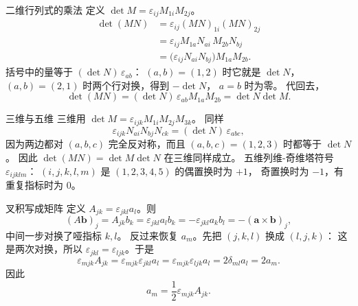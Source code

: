 \documentclass[fontset=windows, chinese, 10pt, xcolor=dvipsnames]{beamer}
\begin{document}
\begin{frame}{二维行列式的乘法}
  定义 $\det M=\varepsilon_{ij}M_{1i}M_{2j}$。
  \begin{align*}
    \det(MN)
    &= \varepsilon_{ij}(MN)_{1i}(MN)_{2j} \\
    &= \varepsilon_{ij}M_{1a}N_{ai}\, M_{2b}N_{bj} \\
    &= \bigl(\varepsilon_{ij}N_{ai}N_{bj}\bigr) M_{1a}M_{2b}.
  \end{align*}
  括号中的量等于 $(\det N)\,\varepsilon_{ab}$：
  $(a,b)=(1,2)$ 时它就是 $\det N$，
  $(a,b)=(2,1)$ 时两个行对换，得到 $-\det N$，
  $a=b$ 时为零。
  代回去，
  \begin{equation*}
    \det(MN)
    =(\det N)\,\varepsilon_{ab}M_{1a}M_{2b}
    =\det N\det M.
  \end{equation*}
\end{frame}

\begin{frame}{三维与五维}
  三维用
  $\det M=\varepsilon_{ijk}M_{1i}M_{2j}M_{3k}$。
  同样
  \begin{equation*}
    \varepsilon_{ijk}N_{ai}N_{bj}N_{ck}
    =(\det N)\,\varepsilon_{abc},
  \end{equation*}
  因为两边都对 $(a,b,c)$ 完全反对称，而且 $(a,b,c)=(1,2,3)$ 时都等于 $\det N$。
  因此 $\det(MN)=\det M\det N$ 在三维同样成立。
  \vspace{0.4em}
  五维列维-奇维塔符号 $\varepsilon_{ijklm}$：
  $(i,j,k,l,m)$ 是 $(1,2,3,4,5)$ 的偶置换时为 $+1$，
  奇置换时为 $-1$，有重复指标时为 $0$。
\end{frame}

\begin{frame}{叉积写成矩阵}
  定义 $A_{jk}=\varepsilon_{jkl}a_l$。则
  \begin{equation*}
    (A\mathbf{b})_j
    =A_{jk}b_k
    =\varepsilon_{jkl}a_l b_k
    =-\varepsilon_{jkl}a_k b_l
    =-(\mathbf{a}\times\mathbf{b})_j,
  \end{equation*}
  中间一步对换了哑指标 $k,l$。
  反过来恢复 $a_m$。先把 $(j,k,l)$ 换成 $(l,j,k)$：
  这是两次对换，所以 $\varepsilon_{jkl}=\varepsilon_{ljk}$。于是
  \begin{equation*}
    \varepsilon_{mjk}A_{jk}
    =\varepsilon_{mjk}\varepsilon_{jkl}a_l
    =\varepsilon_{mjk}\varepsilon_{ljk}a_l
    =2\delta_{ml}a_l
    =2a_m.
  \end{equation*}
  因此
  \begin{equation*}
    a_m=\frac12\varepsilon_{mjk}A_{jk}.
  \end{equation*}
\end{frame}
\end{document}
